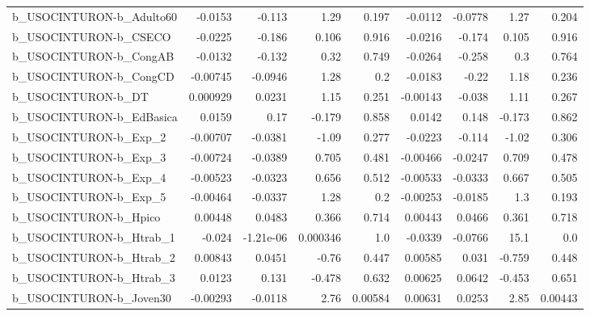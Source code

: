 \begin{tabular}{lrrrrrrrr}
b\_USOCINTURON-b\_Adulto60   &     -0.0153 &       -0.113 &      1.29 &    0.197 &    -0.0112 &     -0.0778 &         1.27 &         0.204 \\
b\_USOCINTURON-b\_CSECO      &     -0.0225 &       -0.186 &     0.106 &    0.916 &    -0.0216 &      -0.174 &        0.105 &         0.916 \\
b\_USOCINTURON-b\_CongAB     &     -0.0132 &       -0.132 &      0.32 &    0.749 &    -0.0264 &      -0.258 &          0.3 &         0.764 \\
b\_USOCINTURON-b\_CongCD     &    -0.00745 &      -0.0946 &      1.28 &      0.2 &    -0.0183 &       -0.22 &         1.18 &         0.236 \\
b\_USOCINTURON-b\_DT         &    0.000929 &       0.0231 &      1.15 &    0.251 &   -0.00143 &      -0.038 &         1.11 &         0.267 \\
b\_USOCINTURON-b\_EdBasica   &      0.0159 &         0.17 &    -0.179 &    0.858 &     0.0142 &       0.148 &       -0.173 &         0.862 \\
b\_USOCINTURON-b\_Exp\_2      &    -0.00707 &      -0.0381 &     -1.09 &    0.277 &    -0.0223 &      -0.114 &        -1.02 &         0.306 \\
b\_USOCINTURON-b\_Exp\_3      &    -0.00724 &      -0.0389 &     0.705 &    0.481 &   -0.00466 &     -0.0247 &        0.709 &         0.478 \\
b\_USOCINTURON-b\_Exp\_4      &    -0.00523 &      -0.0323 &     0.656 &    0.512 &   -0.00533 &     -0.0333 &        0.667 &         0.505 \\
b\_USOCINTURON-b\_Exp\_5      &    -0.00464 &      -0.0337 &      1.28 &      0.2 &   -0.00253 &     -0.0185 &          1.3 &         0.193 \\
b\_USOCINTURON-b\_Hpico      &     0.00448 &       0.0483 &     0.366 &    0.714 &    0.00443 &      0.0466 &        0.361 &         0.718 \\
b\_USOCINTURON-b\_Htrab\_1    &      -0.024 &    -1.21e-06 &  0.000346 &      1.0 &    -0.0339 &     -0.0766 &         15.1 &           0.0 \\
b\_USOCINTURON-b\_Htrab\_2    &     0.00843 &       0.0451 &     -0.76 &    0.447 &    0.00585 &       0.031 &       -0.759 &         0.448 \\
b\_USOCINTURON-b\_Htrab\_3    &      0.0123 &        0.131 &    -0.478 &    0.632 &    0.00625 &      0.0642 &       -0.453 &         0.651 \\
b\_USOCINTURON-b\_Joven30    &    -0.00293 &      -0.0118 &      2.76 &  0.00584 &    0.00631 &      0.0253 &         2.85 &       0.00443 \\

\end{tabular}

